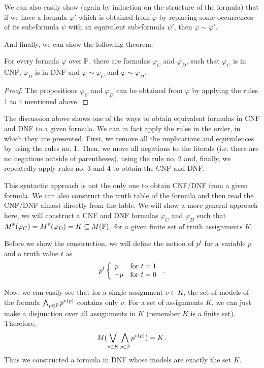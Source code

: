 We can also easily show (again by induction on the structure of the formula) that if we have a formula $\varphi'$ which is obtained from $\varphi$ by replacing some occurrences of its sub-formula $\psi$ with an equivalent sub-formula $\psi'$, then $\varphi \sim \varphi'$.

And finally, we can show the following theorem. 

\begin{theorem}
For every formula $\varphi$ over $\mathbb{P}$, there are formulas $\varphi_C$ and $\varphi_D$, such that $\varphi_C$ is in CNF, $\varphi_D$ is in DNF and $\varphi \sim \varphi_C$ and $\varphi \sim \varphi_D$.
\end{theorem}
\begin{proof}
The propositions $\varphi_C$ and $\varphi_D$ can be obtained from $\varphi$ by applying the rules 1 to 4 mentioned above. 
\end{proof}

The discussion above shows one of the ways to obtain equivalent formulas in CNF and DNF to a given formula. We can in fact apply the rules in the order, in which they are presented. First, we remove all the implications and equivalences by using the rules no. 1. Then, we move all negations to the literals (i.e. there are no negations outside of parentheses), using the rule no. 2 and, finally, we repeatedly apply rules no. 3 and 4 to obtain the CNF and DNF. 

This syntactic approach is not the only one to obtain CNF/DNF from a given formula. We can also construct the truth table of the formula and then read the CNF/DNF almost directly from the table. We will show a more general approach here, we will construct a CNF and DNF formulas $\varphi_C$ and $\varphi_D$ such that $M^\mathbb{P}(\varphi_C) = M^\mathbb{P}(\varphi_D) = K \subseteq M(\mathbb{P})$, for a given finite set of truth assignments $K$. 

Before we show the construction, we will define the notion of $p^t$ for a variable $p$ and a truth value $t$ as $$ p^t \left\{ \begin{array}{ll} p & \text{for } t = 1 \\ \neg p & \text{for } t = 0 \end{array} \right.\,.$$ 

Now, we can easily see that for a single assignment $v \in K$, the set of models of the formula $\bigwedge_{p \in \mathbb{P}} p^{v(p)}$ contains only $v$. For a set of assignments $K$, we can just make a disjunction over all assignments in $K$ (remember $K$ is a finite set). Therefore, $$M(\bigvee_{v \in K}\bigwedge_{p \in \mathbb{P}}p^{v(p)}) = K\,.$$ Thus we constructed a formula in DNF whose models are exactly the set $K$. 

